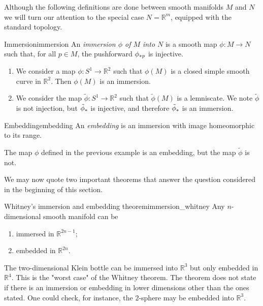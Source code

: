 Although the following definitions are done between smooth manifolds \(M\) and \(N\) we will turn our attention to the special case \(N=\mathbb{R}^m\), equipped with the standard topology.

\begin{definition}{Immersion}{immersion}
    An \emph{immersion \(\phi\) of \(M\) into \(N\)} is a smooth map \(\phi : M \to N\) such that, for all \(p \in M\), the pushforward \(\pf[p]\phi\) is injective.
\end{definition}
\begin{example}
    \begin{enumerate}[label=(\alph*)]
        \item We consider a map \(\phi : S^1 \to \mathbb{R}^2\) such that \(\phi(M)\) is a closed simple smooth curve in \(\mathbb{R}^2\). Then \(\phi(M)\) is an immersion.
        \item We consider the map \(\tilde\phi : S^1 \to \mathbb{R}^2\) such that \(\tilde\phi(M)\) is a lemniscate. We note \(\tilde\phi\) is not injection, but \(\pf{\tilde\phi}\) is injective, and therefore \(\pf{\tilde\phi}\) is an immersion.
    \end{enumerate}
\end{example}

\begin{definition}{Embedding}{embedding}
    An \emph{embedding} is an immersion with image homeomorphic to its range.
\end{definition}
\begin{example}
    The map \(\phi\) defined in the previous example is an embedding, but the map \(\tilde\phi\) is not.
\end{example}

We may now quote two important theorems that answer the question considered in the beginning of this section.

\begin{theorem}{Whitney's immersion and embedding theorem}{immersion_whitney}
    Any \(n\)-dimensional smooth manifold can be
    \begin{enumerate}[label=(\alph*)]
        \item immersed in \(\mathbb{R}^{2n-1}\);
        \item embedded in \(\mathbb{R}^{2n}\).
    \end{enumerate}
\end{theorem}
\begin{example}
    The two-dimensional Klein bottle can be immersed into \(\mathbb{R}^3\) but only embedded in \(\mathbb{R}^4\). This is the "worst case" of the Whitney theorem. The theorem does not state if there is an immersion or embedding in lower dimensions other than the ones stated. One could check, for instance, the 2-sphere may be embedded into \(\mathbb{R}^3\).
\end{example}

